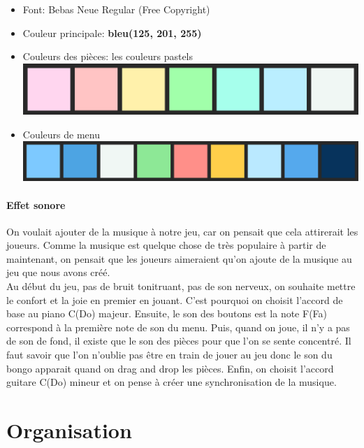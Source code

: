 \documentclass[a4paper]{report}
\begin{document}
\begin{itemize} 
    \item Font: Bebas Neue Regular (Free Copyright)
    \item Couleur principale: \textbf{bleu(125, 201, 255)}
    \item Couleurs des pièces: les couleurs pastels\\
        \includegraphics[scale=0.3]{images/palette1.png}
    \item Couleurs de menu\\
        \includegraphics[scale=0.3]{images/palette2.png}
\end{itemize}

\subsection{Effet sonore}
On voulait ajouter de la musique à notre jeu, car on pensait que cela attirerait les joueurs. 
Comme la musique est quelque chose de très populaire à partir de maintenant, on pensait que les 
joueurs aimeraient qu'on ajoute de la musique au jeu que nous avons créé.\\

Au début du jeu, pas de bruit tonitruant, pas de son nerveux, on souhaite mettre le confort et la joie en premier en jouant. C'est pourquoi on choisit l'accord de base au piano C(Do) majeur.
Ensuite, le son des boutons est la note F(Fa) correspond à la première note de son du menu.
Puis, quand on joue, il n'y a pas de son de fond, il existe que le son des pièces pour que l'on se sente concentré. Il faut savoir que l'on n'oublie pas être en train de jouer au jeu donc le son du bongo apparait quand on drag and drop les pièces.
Enfin, on choisit l'accord guitare C(Do) mineur et on pense à créer une synchronisation de la musique.

\part{Organisation}
\end{document}
